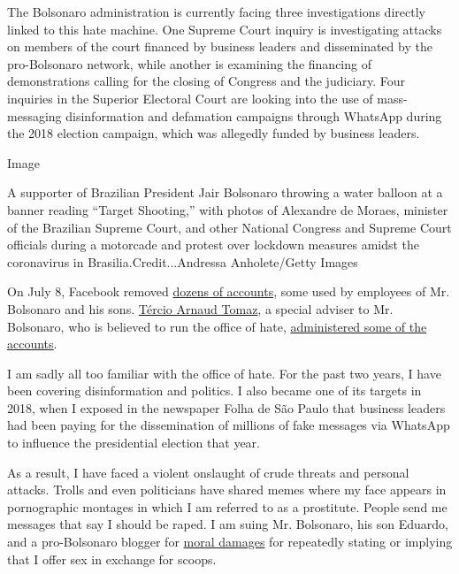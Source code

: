 The Bolsonaro administration is currently facing three investigations
directly linked to this hate machine. One Supreme Court inquiry is
investigating attacks on members of the court financed by business
leaders and disseminated by the pro-Bolsonaro network, while another is
examining the financing of demonstrations calling for the closing of
Congress and the judiciary. Four inquiries in the Superior Electoral
Court are looking into the use of mass-messaging disinformation and
defamation campaigns through WhatsApp during the 2018 election campaign,
which was allegedly funded by business leaders.

Image

A supporter of Brazilian President Jair Bolsonaro throwing a water
balloon at a banner reading ``Target Shooting,'' with photos of
Alexandre de Moraes, minister of the Brazilian Supreme Court, and other
National Congress and Supreme Court officials during a motorcade and
protest over lockdown measures amidst the coronavirus in
Brasilia.Credit...Andressa Anholete/Getty Images

On July 8, Facebook removed
\href{https://www1.folha.uol.com.br/poder/2020/07/facebook-remove-contas-falsas-ligadas-aos-bolsonaros-e-ao-gabinete-da-presidencia.shtml}{dozens
of accounts}, some used by employees of Mr. Bolsonaro and his sons.
\href{https://elpais.com/internacional/2020-07-10/facebook-rompe-la-oficina-del-odio-una-red-de-88-cuentas-de-apoyo-a-jair-bolsonaro.html}{Tércio
Arnaud Tomaz}, a special adviser to Mr. Bolsonaro, who is believed to
run the office of hate,
\href{https://apnews.com/0c58cccec2004bf250c8dab38172cbc9}{administered
some of the accounts}.

I am sadly all too familiar with the office of hate. For the past two
years, I have been covering disinformation and politics. I also became
one of its targets in 2018, when I exposed in the newspaper Folha de São
Paulo that business leaders had been paying for the dissemination of
millions of fake messages via WhatsApp to influence the presidential
election that year.

As a result, I have faced a violent onslaught of crude threats and
personal attacks. Trolls and even politicians have shared memes where my
face appears in pornographic montages in which I am referred to as a
prostitute. People send me messages that say I should be raped. I am
suing Mr. Bolsonaro, his son Eduardo, and a pro-Bolsonaro blogger for
\href{http://www.fundamedios.us/incidentes/patriciacampos-demanda-jairbolsonaro-ofensas-periodista/}{moral
damages} for repeatedly stating or implying that I offer sex in exchange
for scoops.

